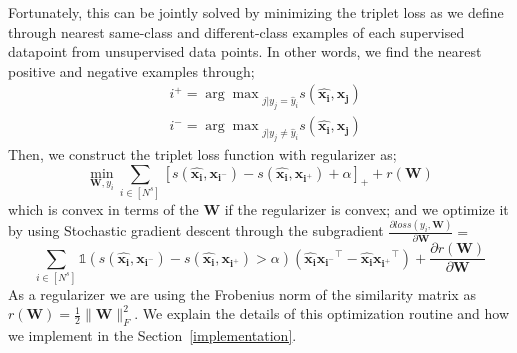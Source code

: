 Fortunately, this can be jointly solved by minimizing the triplet loss as we define through nearest same-class and different-class examples of each supervised datapoint from unsupervised data points. In other words, we find the nearest positive and negative examples through;
\begin{equation}
\begin{aligned}
&i^{+} = {\arg\max}_{j | y_j = \hat{y}_i} s(\mathbf{\hat{x_i}},\mathbf{x_{j}}) \\
&i^{-} = {\arg\max}_{j | y_j \neq \hat{y}_i} s(\mathbf{\hat{x_i}},\mathbf{x_{j}}) 
\label{sup_nn}
\end{aligned}
\end{equation}
Then, we construct the triplet loss function with regularizer as;
\begin{equation}
\min_{\mathbf{W}, y_i} \sum_{i \in [N^s]} [s(\mathbf{\hat{x_i}},\mathbf{x_{i^-}}) - s(\mathbf{\hat{x_i}},\mathbf{x_{i^+}}) + \alpha]_{+} + r(\mathbf{W})
\end{equation}
which is convex in terms of the $\mathbf{W}$ if the regularizer is convex; and we optimize it by using Stochastic gradient descent through the subgradient $\frac{\partial loss (y_i, \mathbf{W})}{\partial \mathbf{W}} =$
\begin{equation}
\sum_{i \in [N^s]} \mathds{1}(s(\mathbf{\hat{x_i}},\mathbf{x_{i^-}}) - s(\mathbf{\hat{x_i}},\mathbf{x_{i^+}})>\alpha) \left( \mathbf{\hat{x_i}}\mathbf{x_{i^-}}^\intercal - \mathbf{\hat{x_i}}\mathbf{x_{i^+}}^\intercal  \right)  + \frac{\partial r ( \mathbf{W})}{\partial \mathbf{W}}
\label{gradw}
\end{equation}
As a regularizer we are using the Frobenius norm of the similarity matrix as $r(\mathbf{W})=\frac{1}{2}\|\mathbf{W}\|_F^2$. We explain the details of this optimization routine and how we implement in the Section~\ref{implementation}.
